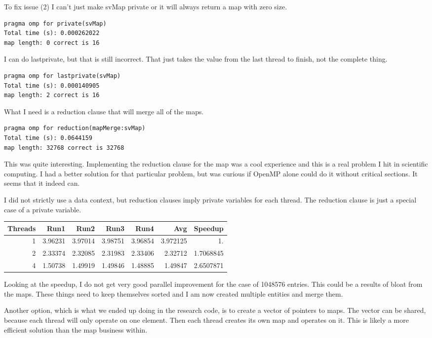 \documentclass[11pt]{article}
\begin{document}
To fix issue (2) I can't just make svMap private or it will always
return a map with zero size.
\begin{verbatim}
pragma omp for private(svMap)
Total time (s): 0.000262022
map length: 0 correct is 16
\end{verbatim}
I can do lastprivate, but that is still incorrect. That just takes the
value from the last thread to finish, not the complete thing.
\begin{verbatim}
pragma omp for lastprivate(svMap)
Total time (s): 0.000140905
map length: 2 correct is 16
\end{verbatim}
What I need is a reduction clause that will merge all of the maps.
\begin{verbatim}
pragma omp for reduction(mapMerge:svMap)
Total time (s): 0.0644159
map length: 32768 correct is 32768
\end{verbatim}

This was quite interesting. Implementing the reduction clause for the
map was a cool experience and this is a real problem I hit in
scientific computing. I had a better solution for that particular
problem, but was curious if OpenMP alone could do it without critical
sections. It seems that it indeed can.

I did not strictly use a data context, but reduction clauses imply
private variables for each thread. The reduction clause is just a
special case of a private variable.

\begin{center}
\begin{tabular}{rrrrrrr}
Threads & Run1 & Run2 & Run3 & Run4 & Avg & Speedup\\[0pt]
\hline
1 & 3.96231 & 3.97014 & 3.98751 & 3.96854 & 3.972125 & 1.\\[0pt]
2 & 2.33374 & 2.32085 & 2.31983 & 2.33406 & 2.32712 & 1.7068845\\[0pt]
4 & 1.50738 & 1.49919 & 1.49846 & 1.48885 & 1.49847 & 2.6507871\\[0pt]
\end{tabular}
\end{center}
Looking at the speedup, I do not get very good parallel improvement
for the case of 1048576 entries. This could be a results of bloat from
the maps. These things need to keep themselves sorted and I am now created
multiple entities and merge them.

Another option, which is what we
ended up doing in the research code, is to create a vector of pointers
to maps. The vector can be shared, because each thread will only
operate on one element. Then each thread creates its own map and
operates on it. This is likely a more efficient solution than the map
business within. 
\end{document}
